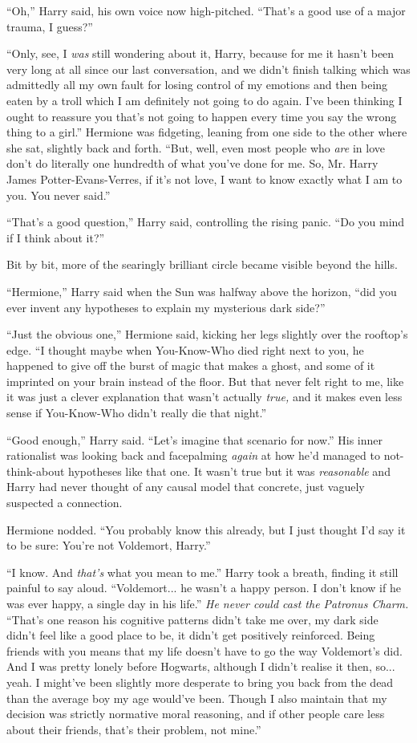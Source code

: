 ``Oh,'' Harry said, his own voice now high-pitched. ``That's a good use of a major trauma, I guess?''

``Only, see, I \emph{was} still wondering about it, Harry, because for me it hasn't been very long at all since our last conversation, and we didn't finish talking which was admittedly all my own fault for losing control of my emotions and then being eaten by a troll which I am definitely not going to do again. I've been thinking I ought to reassure you that's not going to happen every time you say the wrong thing to a girl.'' Hermione was fidgeting, leaning from one side to the other where she sat, slightly back and forth. ``But, well, even most people who \emph{are} in love don't do literally one hundredth of what you've done for me. So, Mr. Harry James Potter-Evans-Verres, if it's not love, I want to know exactly what I am to you. You never said.''

``That's a good question,'' Harry said, controlling the rising panic. ``Do you mind if I think about it?''

Bit by bit, more of the searingly brilliant circle became visible beyond the hills.

``Hermione,'' Harry said when the Sun was halfway above the horizon, ``did you ever invent any hypotheses to explain my mysterious dark side?''

``Just the obvious one,'' Hermione said, kicking her legs slightly over the rooftop's edge. ``I thought maybe when You-Know-Who died right next to you, he happened to give off the burst of magic that makes a ghost, and some of it imprinted on your brain instead of the floor. But that never felt right to me, like it was just a clever explanation that wasn't actually \emph{true,} and it makes even less sense if You-Know-Who didn't really die that night.''

``Good enough,'' Harry said. ``Let's imagine that scenario for now.'' His inner rationalist was looking back and facepalming \emph{again} at how he'd managed to not-think-about hypotheses like that one. It wasn't true but it was \emph{reasonable} and Harry had never thought of any causal model that concrete, just vaguely suspected a connection.

Hermione nodded. ``You probably know this already, but I just thought I'd say it to be sure: You're not Voldemort, Harry.''

``I know. And \emph{that's} what you mean to me.'' Harry took a breath, finding it still painful to say aloud. ``Voldemort... he wasn't a happy person. I don't know if he was ever happy, a single day in his life.'' \emph{He never could cast the Patronus Charm.} ``That's one reason his cognitive patterns didn't take me over, my dark side didn't feel like a good place to be, it didn't get positively reinforced. Being friends with you means that my life doesn't have to go the way Voldemort's did. And I was pretty lonely before Hogwarts, although I didn't realise it then, so... yeah. I might've been slightly more desperate to bring you back from the dead than the average boy my age would've been. Though I also maintain that my decision was strictly normative moral reasoning, and if other people care less about their friends, that's their problem, not mine.''

